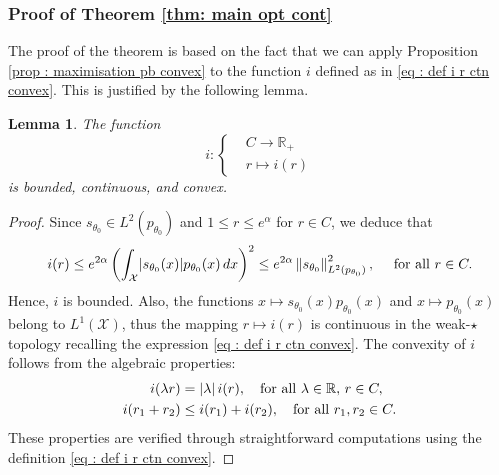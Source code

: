 \documentclass[a4paper, 11pt]{article}
\newtheorem{lem}{Lemma}
\newtheorem{prop}{Proposition}
\theoremstyle{definition}
\newcommand{\norm}[1]{\left\|{#1}\right\|}
\newcommand{\R}{{\mathbb{R}}}
\newcommand{\cE}{{\mathcal{E}}}
\newcommand{\cX}{{\mathcal{X}}}
\newcommand{\theconvex}{C}
\DeclarePairedDelimiter{\abs}{\lvert}{\rvert}
\begin{document}
{\subsubsection{Proof of Theorem \ref{thm: main opt cont}}
The proof of the theorem is based on the fact that we can apply Proposition \ref{prop : maximisation pb convex} to the function \( i \) defined as in \eqref{eq : def i r ctn convex}. This is justified by the following lemma.
\begin{lem}\label{lem : i ctn cvx}
The function 
\[
i: \begin{cases} 
& \theconvex \to \R_+ \\ 
&r \mapsto i(r)
\end{cases}
\]
is bounded, continuous, and convex.
\end{lem}
\begin{proof}
Since \( s_{\theta_0} \in L^2(p_{\theta_0}) \) and \( 1 \le r \le e^{\alpha} \) for \( r \in \theconvex \), we deduce that
\[
i(r) \le e^{2\alpha} \left( \int_\cX \abs{s_{\theta_0}(x)} p_{\theta_0}(x) \, dx \right)^2
\le e^{2\alpha} \norm{s_{\theta_0}}_{ L^2(p_{\theta_0})}^2, ~
\quad \text{for all } r \in \theconvex.
\]
Hence, \( i \) is bounded. Also, the functions \( x \mapsto s_{\theta_0}(x) p_{\theta_0}(x) \) and \( x \mapsto p_{\theta_0}(x) \) belong to \( L^1(\cX) \), thus the mapping \( r \mapsto i(r) \) is continuous in the weak-\(\star\) topology
recalling the expression \eqref{eq : def i r ctn convex}. The convexity of \( i \) follows from the algebraic properties:
\begin{align*}
i(\lambda r) &= \abs{\lambda} \, i(r), \quad \text{for all } \lambda \in \R,\, r \in \theconvex, \\
i(r_1 + r_2) &\le i(r_1) + i(r_2), \quad \text{for all } r_1, r_2 \in \theconvex.
\end{align*}
These properties are verified through straightforward computations using the definition \eqref{eq : def i r ctn convex}.
\end{proof}

}
\end{document}
